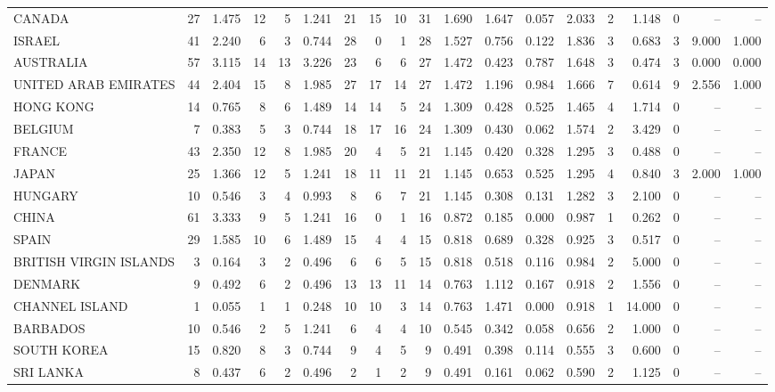 \begin{tabular}{lrrrrrrrrrrrrrrrrrr}
CANADA & 27 & 1.475 & 12 & 5 & 1.241 & 21 & 15 & 10 & 31 & 1.690 & 1.647 & 0.057 & 2.033 & 2 & 1.148 & 0 & -- & -- \\
ISRAEL & 41 & 2.240 & 6 & 3 & 0.744 & 28 & 0 & 1 & 28 & 1.527 & 0.756 & 0.122 & 1.836 & 3 & 0.683 & 3 & 9.000 & 1.000 \\
AUSTRALIA & 57 & 3.115 & 14 & 13 & 3.226 & 23 & 6 & 6 & 27 & 1.472 & 0.423 & 0.787 & 1.648 & 3 & 0.474 & 3 & 0.000 & 0.000 \\
UNITED ARAB EMIRATES & 44 & 2.404 & 15 & 8 & 1.985 & 27 & 17 & 14 & 27 & 1.472 & 1.196 & 0.984 & 1.666 & 7 & 0.614 & 9 & 2.556 & 1.000 \\
HONG KONG & 14 & 0.765 & 8 & 6 & 1.489 & 14 & 14 & 5 & 24 & 1.309 & 0.428 & 0.525 & 1.465 & 4 & 1.714 & 0 & -- & -- \\
BELGIUM & 7 & 0.383 & 5 & 3 & 0.744 & 18 & 17 & 16 & 24 & 1.309 & 0.430 & 0.062 & 1.574 & 2 & 3.429 & 0 & -- & -- \\
FRANCE & 43 & 2.350 & 12 & 8 & 1.985 & 20 & 4 & 5 & 21 & 1.145 & 0.420 & 0.328 & 1.295 & 3 & 0.488 & 0 & -- & -- \\
JAPAN & 25 & 1.366 & 12 & 5 & 1.241 & 18 & 11 & 11 & 21 & 1.145 & 0.653 & 0.525 & 1.295 & 4 & 0.840 & 3 & 2.000 & 1.000 \\
HUNGARY & 10 & 0.546 & 3 & 4 & 0.993 & 8 & 6 & 7 & 21 & 1.145 & 0.308 & 0.131 & 1.282 & 3 & 2.100 & 0 & -- & -- \\
CHINA & 61 & 3.333 & 9 & 5 & 1.241 & 16 & 0 & 1 & 16 & 0.872 & 0.185 & 0.000 & 0.987 & 1 & 0.262 & 0 & -- & -- \\
SPAIN & 29 & 1.585 & 10 & 6 & 1.489 & 15 & 4 & 4 & 15 & 0.818 & 0.689 & 0.328 & 0.925 & 3 & 0.517 & 0 & -- & -- \\
BRITISH VIRGIN ISLANDS & 3 & 0.164 & 3 & 2 & 0.496 & 6 & 6 & 5 & 15 & 0.818 & 0.518 & 0.116 & 0.984 & 2 & 5.000 & 0 & -- & -- \\
DENMARK & 9 & 0.492 & 6 & 2 & 0.496 & 13 & 13 & 11 & 14 & 0.763 & 1.112 & 0.167 & 0.918 & 2 & 1.556 & 0 & -- & -- \\
CHANNEL ISLAND & 1 & 0.055 & 1 & 1 & 0.248 & 10 & 10 & 3 & 14 & 0.763 & 1.471 & 0.000 & 0.918 & 1 & 14.000 & 0 & -- & -- \\
BARBADOS & 10 & 0.546 & 2 & 5 & 1.241 & 6 & 4 & 4 & 10 & 0.545 & 0.342 & 0.058 & 0.656 & 2 & 1.000 & 0 & -- & -- \\
SOUTH KOREA & 15 & 0.820 & 8 & 3 & 0.744 & 9 & 4 & 5 & 9 & 0.491 & 0.398 & 0.114 & 0.555 & 3 & 0.600 & 0 & -- & -- \\
SRI LANKA & 8 & 0.437 & 6 & 2 & 0.496 & 2 & 1 & 2 & 9 & 0.491 & 0.161 & 0.062 & 0.590 & 2 & 1.125 & 0 & -- & -- \\

\end{tabular}
